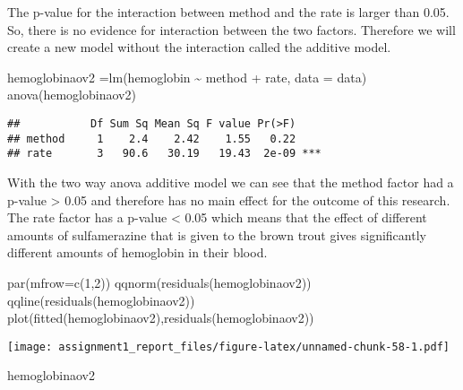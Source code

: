 \documentclass[
]{article}
\newenvironment{Shaded}{\begin{snugshade}}{\end{snugshade}}
\newcommand{\AttributeTok}[1]{\textcolor[rgb]{0.77,0.63,0.00}{#1}}
\newcommand{\DecValTok}[1]{\textcolor[rgb]{0.00,0.00,0.81}{#1}}
\newcommand{\FunctionTok}[1]{\textcolor[rgb]{0.00,0.00,0.00}{#1}}
\newcommand{\NormalTok}[1]{#1}
\newcommand{\OtherTok}[1]{\textcolor[rgb]{0.56,0.35,0.01}{#1}}
\newcommand{\SpecialCharTok}[1]{\textcolor[rgb]{0.00,0.00,0.00}{#1}}
\begin{document}
The p-value for the interaction between method and the rate is larger
than 0.05. So, there is no evidence for interaction between the two
factors. Therefore we will create a new model without the interaction
called the additive model.

\begin{Shaded}
\begin{Highlighting}[]
\NormalTok{hemoglobinaov2 }\OtherTok{=}\FunctionTok{lm}\NormalTok{(hemoglobin }\SpecialCharTok{\textasciitilde{}}\NormalTok{ method }\SpecialCharTok{+}\NormalTok{ rate, }\AttributeTok{data =}\NormalTok{ data)}
\FunctionTok{anova}\NormalTok{(hemoglobinaov2)}
\end{Highlighting}
\end{Shaded}

\begin{verbatim}
##           Df Sum Sq Mean Sq F value Pr(>F)    
## method     1    2.4    2.42    1.55   0.22    
## rate       3   90.6   30.19   19.43  2e-09 ***
\end{verbatim}

With the two way anova additive model we can see that the method factor
had a p-value \textgreater{} 0.05 and therefore has no main effect for
the outcome of this research. The rate factor has a p-value \textless{}
0.05 which means that the effect of different amounts of sulfamerazine
that is given to the brown trout gives significantly different amounts
of hemoglobin in their blood.

\begin{Shaded}
\begin{Highlighting}[]
\FunctionTok{par}\NormalTok{(}\AttributeTok{mfrow=}\FunctionTok{c}\NormalTok{(}\DecValTok{1}\NormalTok{,}\DecValTok{2}\NormalTok{))}
\FunctionTok{qqnorm}\NormalTok{(}\FunctionTok{residuals}\NormalTok{(hemoglobinaov2))}
\FunctionTok{qqline}\NormalTok{(}\FunctionTok{residuals}\NormalTok{(hemoglobinaov2))}
\FunctionTok{plot}\NormalTok{(}\FunctionTok{fitted}\NormalTok{(hemoglobinaov2),}\FunctionTok{residuals}\NormalTok{(hemoglobinaov2))}
\end{Highlighting}
\end{Shaded}

\texttt{[image: assignment1\_report\_files/figure-latex/unnamed-chunk-58-1.pdf]}

\begin{Shaded}
\begin{Highlighting}[]
\NormalTok{hemoglobinaov2}
\end{Highlighting}
\end{Shaded}
\end{document}
